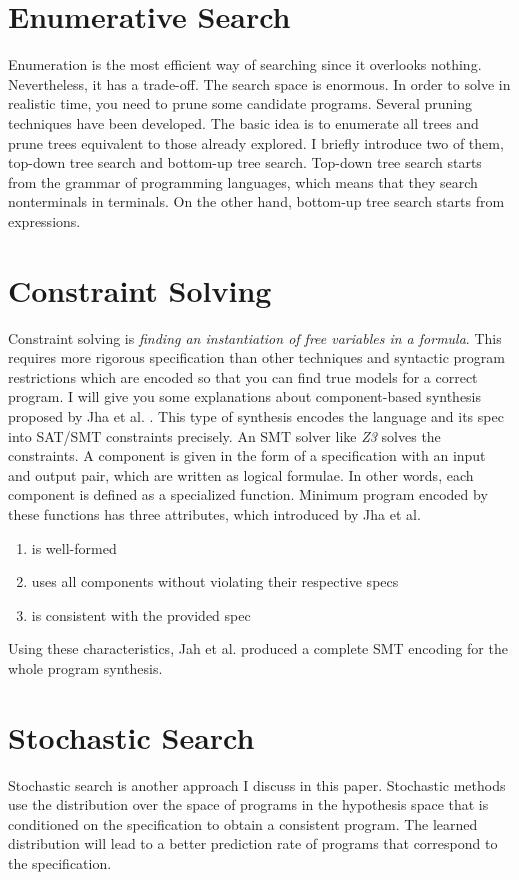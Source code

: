\documentclass[12pt, a4paper, titlepage]{report}
\begin{document}
  \section{Enumerative Search}
  Enumeration is the most efficient way of searching since it overlooks nothing.
  Nevertheless, it has a trade-off.
  The search space is enormous.
  In order to solve in realistic time, you need to prune some candidate programs.
  Several pruning techniques have been developed.
  The basic idea is to enumerate all trees and prune trees equivalent to those already explored.
  I briefly introduce two of them, top-down tree search and bottom-up tree search.
  Top-down tree search starts from the grammar of programming languages, which means that they search nonterminals in terminals.
  On the other hand, bottom-up tree search starts from expressions.

  \section{Constraint Solving}
    Constraint solving is \textit{finding an instantiation of free variables in a formula}. This requires more rigorous specification than other techniques and syntactic program restrictions which are encoded so that you can find true models for a correct program.
    I will give you some explanations about component-based synthesis proposed by Jha et al. \cite{jha:2010}.
    This type of synthesis encodes the language and its spec into SAT/SMT constraints precisely.
    An SMT solver like \textit{Z3} \cite{moura:2008} solves the constraints.
    A component is given in the form of a specification with an input and output pair, which are written as logical formulae.
    In other words, each component is defined as a specialized function.
    Minimum program encoded by these functions has three attributes, which introduced by Jha et al.
    \begin{enumerate}
        \item is well-formed
        \item uses all components without violating their respective specs
        \item is consistent with the provided spec
    \end{enumerate}
    Using these characteristics, Jah et al. produced a complete SMT encoding for the whole program synthesis.

  \section{Stochastic Search}
    Stochastic search is another approach I discuss in this paper.
    Stochastic methods use the distribution over the space of programs in the hypothesis space that is conditioned on the specification to obtain a consistent program.
    The learned distribution will lead to a better prediction rate of programs that correspond to the specification.
\end{document}
